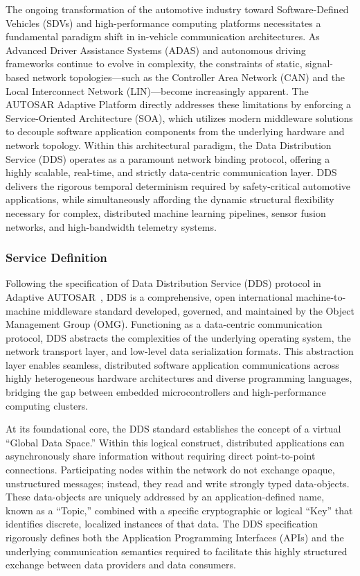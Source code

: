 The ongoing transformation of the automotive industry toward Software-Defined Vehicles (SDVs) and high-performance computing platforms necessitates a fundamental paradigm shift in in-vehicle communication architectures. As Advanced Driver Assistance Systems (ADAS) and autonomous driving frameworks continue to evolve in complexity, the constraints of static, signal-based network topologies---such as the Controller Area Network (CAN) and the Local Interconnect Network (LIN)---become increasingly apparent. The AUTOSAR Adaptive Platform directly addresses these limitations by enforcing a Service-Oriented Architecture (SOA), which utilizes modern middleware solutions to decouple software application components from the underlying hardware and network topology. Within this architectural paradigm, the Data Distribution Service (DDS) operates as a paramount network binding protocol, offering a highly scalable, real-time, and strictly data-centric communication layer. DDS delivers the rigorous temporal determinism required by safety-critical automotive applications, while simultaneously affording the dynamic structural flexibility necessary for complex, distributed machine learning pipelines, sensor fusion networks, and high-bandwidth telemetry systems.

\subsubsection{Service Definition}

Following the specification of Data Distribution Service (DDS) protocol in Adaptive AUTOSAR~\cite{autosar_dds}, DDS is a comprehensive, open international machine-to-machine middleware standard developed, governed, and maintained by the Object Management Group (OMG). Functioning as a data-centric communication protocol, DDS abstracts the complexities of the underlying operating system, the network transport layer, and low-level data serialization formats. This abstraction layer enables seamless, distributed software application communications across highly heterogeneous hardware architectures and diverse programming languages, bridging the gap between embedded microcontrollers and high-performance computing clusters.

At its foundational core, the DDS standard establishes the concept of a virtual ``Global Data Space.'' Within this logical construct, distributed applications can asynchronously share information without requiring direct point-to-point connections. Participating nodes within the network do not exchange opaque, unstructured messages; instead, they read and write strongly typed data-objects. These data-objects are uniquely addressed by an application-defined name, known as a ``Topic,'' combined with a specific cryptographic or logical ``Key'' that identifies discrete, localized instances of that data. The DDS specification rigorously defines both the Application Programming Interfaces (APIs) and the underlying communication semantics required to facilitate this highly structured exchange between data providers and data consumers.

